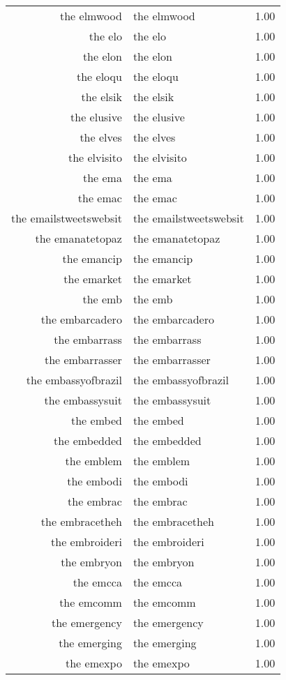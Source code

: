 \begin{table}[ht]
\begin{tabular}{rlr}
  the elmwood & the elmwood & 1.00 \\ 
  the elo & the elo & 1.00 \\ 
  the elon & the elon & 1.00 \\ 
  the eloqu & the eloqu & 1.00 \\ 
  the elsik & the elsik & 1.00 \\ 
  the elusive & the elusive & 1.00 \\ 
  the elves & the elves & 1.00 \\ 
  the elvisito & the elvisito & 1.00 \\ 
  the ema & the ema & 1.00 \\ 
  the emac & the emac & 1.00 \\ 
  the emailstweetswebsit & the emailstweetswebsit & 1.00 \\ 
  the emanatetopaz & the emanatetopaz & 1.00 \\ 
  the emancip & the emancip & 1.00 \\ 
  the emarket & the emarket & 1.00 \\ 
  the emb & the emb & 1.00 \\ 
  the embarcadero & the embarcadero & 1.00 \\ 
  the embarrass & the embarrass & 1.00 \\ 
  the embarrasser & the embarrasser & 1.00 \\ 
  the embassyofbrazil & the embassyofbrazil & 1.00 \\ 
  the embassysuit & the embassysuit & 1.00 \\ 
  the embed & the embed & 1.00 \\ 
  the embedded & the embedded & 1.00 \\ 
  the emblem & the emblem & 1.00 \\ 
  the embodi & the embodi & 1.00 \\ 
  the embrac & the embrac & 1.00 \\ 
  the embracetheh & the embracetheh & 1.00 \\ 
  the embroideri & the embroideri & 1.00 \\ 
  the embryon & the embryon & 1.00 \\ 
  the emcca & the emcca & 1.00 \\ 
  the emcomm & the emcomm & 1.00 \\ 
  the emergency & the emergency & 1.00 \\ 
  the emerging & the emerging & 1.00 \\ 
  the emexpo & the emexpo & 1.00 \\ 

\end{tabular}
\end{table}
